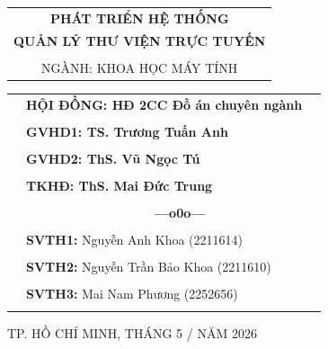 \documentclass[a4paper]{article}
\theoremstyle{definition}
\begin{document}
\begin{titlepage}
\begin{center}
\begin{tabular}{c}
\textbf{\LARGE PHÁT TRIỂN HỆ THỐNG } \\
\textbf{\LARGE QUẢN LÝ THƯ VIỆN TRỰC TUYẾN}
\\
\\ \vspace{0.5cm} {\Large NGÀNH: KHOA HỌC MÁY TÍNH}
\end{tabular}
\end{center}
\vspace{0.5cm}
\begin{table}[h]
\begin{tabular}{rll}
\hspace{6 cm} &  \textbf{\Large HỘI ĐỒNG: HĐ 2CC Đồ án chuyên ngành} {\Large }
\\
\\
\hspace{6 cm} &   \textbf{\Large GVHD1: TS. Trương Tuấn Anh} {\Large } \\
\\
\hspace{6 cm} &   \textbf{\Large GVHD2: ThS. Vũ Ngọc Tú} {\Large }
\\
\\
\hspace{6 cm}  &   \textbf{\Large TKHĐ: ThS. Mai Đức Trung} {\Large}
\\
\\
\hspace{6 cm} &     \textbf{$\;$ $\;$$\;$$\;$$\;$$\;$$\;$$\;$$\;$$\;$$\;$$\;$$\;$$\;$$\;$$\;$$\;$$\;$$\;$$\;$$\;$$\;$$\;$$\;$$\;$$\;$$\;$$\;$$\;$$\;$$\;$$\;$$\;$$\;$ \Large ---o0o---} 
\\
\\
\hspace{6 cm} &   \textbf{\Large SVTH1:} {\Large Nguyễn Anh Khoa (2211614)}
\\
\\
\hspace{6 cm}&   \textbf{\Large SVTH2:}  {\Large Nguyễn Trần Bảo Khoa (2211610)}
\\
\\
\hspace{6 cm} &   \textbf{\Large SVTH3:}  {\Large Mai Nam Phương (2252656)}
\\
\\
\end{tabular}
\end{table}
\vspace{0.5cm}
\begin{center}
{\Large TP. HỒ CHÍ MINH, THÁNG 5 / NĂM 2026 }
\end{center}
\end{titlepage}
\newpage



\newpage
\tableofcontents
\newpage
\listoffigures
\newpage
\listoftables
\newpage
\setcounter{page}{1}
\end{document}
